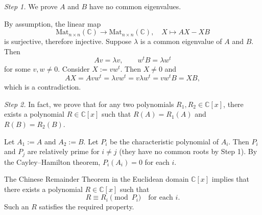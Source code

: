 \begin{solution}
    \textit{Step 1.} We prove \( A \) and \( B \) have no common eigenvalues.

    By assumption, the linear map
    \[
        \mathrm{Mat}_{n \times n}\left(\mathbb{C}\right) \to \mathrm{Mat}_{n \times n}\left(\mathbb{C}\right), \quad X \mapsto AX - XB
    \]
    is surjective, therefore injective. Suppose \( \lambda \) is a common eigenvalue of \( A \) and \( B \). Then
    \[
        Av = \lambda v, \qquad w^t B = \lambda w^t
    \]
    for some \( v, w \neq 0 \). Consider \( X := v w^t \). Then \( X \neq 0 \) and
    \[
        AX = Av w^t = \lambda v w^t = v \lambda w^t = v w^t B = XB,
    \]
    which is a contradiction.

    \textit{Step 2.} In fact, we prove that for any two polynomials \( R_1, R_2 \in \mathbb{C}\left[x\right] \), there exists a polynomial \( R \in \mathbb{C}\left[x\right] \) such that \( R\left(A\right) = R_1\left(A\right) \) and \( R\left(B\right) = R_2\left(B\right) \).

    Let \( A_1 := A \) and \( A_2 := B \). Let \( P_i \) be the characteristic polynomial of \( A_i \). Then \( P_i \) and \( P_j \) are relatively prime for \( i \neq j \) (they have no common roots by Step 1). By the Cayley–Hamilton theorem, \( P_i\left(A_i\right) = 0 \) for each \( i \).

    The Chinese Remainder Theorem in the Euclidean domain \( \mathbb{C}\left[x\right] \) implies that there exists a polynomial \( R \in \mathbb{C}\left[x\right] \) such that
    \[
        R \equiv R_i \pmod{P_i} \quad \text{for each } i.
    \]
    Such an \( R \) satisfies the required property.
\end{solution}
